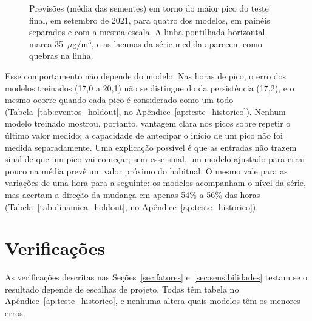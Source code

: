 \begin{figure}[!htbp]
    \centering
    \caption[Previsões em torno do maior pico do teste final]{Previsões (média das sementes) em torno do maior pico do teste final, em setembro de 2021, para quatro dos modelos, em painéis separados e com a mesma escala. A linha pontilhada horizontal marca 35~\(\mu\)g/m\(^3\), e as lacunas da série medida aparecem como quebras na linha.}
    \label{fig:janela_evento_holdout}
\end{figure}

Esse comportamento não depende do modelo. Nas horas de pico, o erro dos modelos treinados (17,0 a 20,1) não se distingue do da persistência (17,2), e o mesmo ocorre quando cada pico é considerado como um todo (Tabela~\ref{tab:eventos_holdout}, no Apêndice~\ref{ap:teste_historico}). Nenhum modelo treinado mostrou, portanto, vantagem clara nos picos sobre repetir o último valor medido; a capacidade de antecipar o início de um pico não foi medida separadamente. Uma explicação possível é que as entradas não trazem sinal de que um pico vai começar; sem esse sinal, um modelo ajustado para errar pouco na média prevê um valor próximo do habitual. O mesmo vale para as variações de uma hora para a seguinte: os modelos acompanham o nível da série, mas acertam a direção da mudança em apenas 54\% a 56\% das horas (Tabela~\ref{tab:dinamica_holdout}, no Apêndice~\ref{ap:teste_historico}).

\section{Verificações}
\label{sec:efeito_perda}

As verificações descritas nas Seções~\ref{sec:fatores} e~\ref{sec:sensibilidades} testam se o resultado depende de escolhas de projeto. Todas têm tabela no Apêndice~\ref{ap:teste_historico}, e nenhuma altera quais modelos têm os menores erros.

